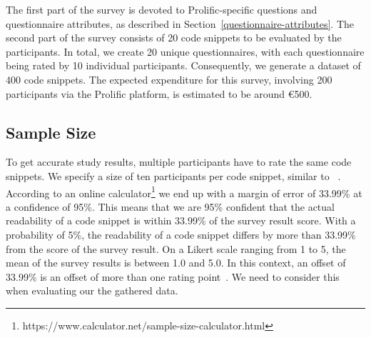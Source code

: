 \documentclass[%
class=scrreprt,
chapterprefix=false,%
open=right,%
twoside=false,%
paper=a4,%
logofile={Logo\_zentral\_farbig\_EN.png},%
thesistype=masterproposal,%
UKenglish,%
]{se2thesis}
\begin{document}
The first part of the survey is devoted to Prolific-specific questions and questionnaire attributes, as described in Section~\ref{questionnaire-attributes}. The second part of the survey consists of 20 code snippets to be evaluated by the participants.
In total, we create 20 unique questionnaires, with each questionnaire being rated by 10 individual participants. Consequently, we generate a dataset of 400 code snippets. The expected expenditure for this survey, involving 200 participants via the Prolific platform, is estimated to be around €500.

\subsection{Sample Size}
To get accurate study results, multiple participants have to rate the same code snippets. We specify a size of ten participants per code snippet, similar to \citeauthor{scalabrino2018comprehensive}~\cite{scalabrino2018comprehensive}. According to an online calculator\footnote{https://www.calculator.net/sample-size-calculator.html} we end up with a margin of error of 33.99\% at a confidence of 95\%. This means that we are 95\% confident that the actual readability of a code snippet is within 33.99\% of the survey result score. With a probability of 5\%, the readability of a code snippet differs by more than 33.99\% from the score of the survey result. On a Likert scale ranging from 1 to 5, the mean of the survey results is between 1.0 and 5.0. In this context, an offset of 33.99\% is an offset of more than one rating point~\cite{likert1932technique}. We need to consider this when evaluating our the gathered data.



\end{document}
